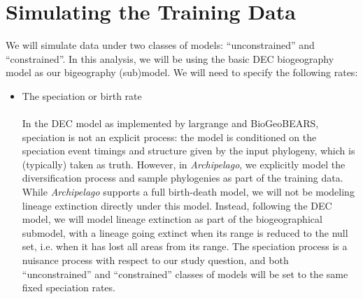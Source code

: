 \documentclass[11pt,openany]{memoir} %
\newcommand{\archipelagoModel}{\textit{Archipelago}\xspace}
\begin{document}
\section{Simulating the Training Data}

We will simulate data under two classes of models: ``unconstrained'' and ``constrained''.
In this analysis, we will be using the basic DEC biogeography model as our bigeography (sub)model.
We will need to specify the following rates:

\begin{itemize}
    \item The speciation or birth rate \hfill \\
        \\
        In the DEC model as implemented by largrange and BioGeoBEARS, speciation is not an explicit process: the model is conditioned on the speciation event timings and structure given by the input phylogeny, which is (typically) taken as truth.
        However, in \archipelagoModel, we explicitly model the diversification process and sample phylogenies as part of the training data.
        While \archipelagoModel supports a full birth-death model, we will not be modeling lineage extinction directly under this model.
        Instead, following the DEC model, we will model lineage extinction as part of the biogeographical submodel, with a lineage going extinct when its range is reduced to the null set, i.e. when it has lost all areas from its range.
        The speciation process is a nuisance process with respect to our study question, and both ``unconstrained'' and ``constrained'' classes of models will be set to the same fixed speciation rates.

\end{itemize}
\end{document}
